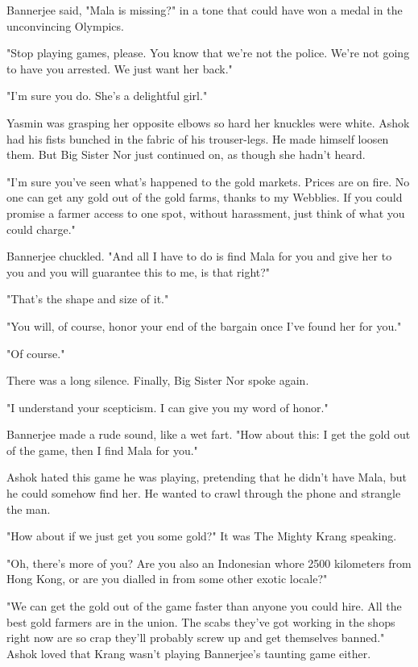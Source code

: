 Bannerjee said, "Mala is missing?" in a tone that could have won a
medal in the unconvincing Olympics.

"Stop playing games, please. You know that we're not the police.
We're not going to have you arrested. We just want her back."

"I'm sure you do. She's a delightful girl."

Yasmin was grasping her opposite elbows so hard her knuckles were
white. Ashok had his fists bunched in the fabric of his
trouser-legs. He made himself loosen them. But Big Sister Nor just
continued on, as though she hadn't heard.

"I'm sure you've seen what's happened to the gold markets. Prices
are on fire. No one can get any gold out of the gold farms, thanks
to my Webblies. If you could promise a farmer access to one spot,
without harassment, just think of what you could charge."

Bannerjee chuckled. "And all I have to do is find Mala for you and
give her to you and you will guarantee this to me, is that right?"

"That's the shape and size of it."

"You will, of course, honor your end of the bargain once I've found
her for you."

"Of course."

There was a long silence. Finally, Big Sister Nor spoke again.

"I understand your scepticism. I can give you my word of honor."

Bannerjee made a rude sound, like a wet fart. "How about this: I
get the gold out of the game, then I find Mala for you."

Ashok hated this game he was playing, pretending that he didn't
have Mala, but he could somehow find her. He wanted to crawl
through the phone and strangle the man.

"How about if we just get you some gold?" It was The Mighty Krang
speaking.

"Oh, there's more of you? Are you also an Indonesian whore 2500
kilometers from Hong Kong, or are you dialled in from some other
exotic locale?"

"We can get the gold out of the game faster than anyone you could
hire. All the best gold farmers are in the union. The scabs they've
got working in the shops right now are so crap they'll probably
screw up and get themselves banned." Ashok loved that Krang wasn't
playing Bannerjee's taunting game either.

